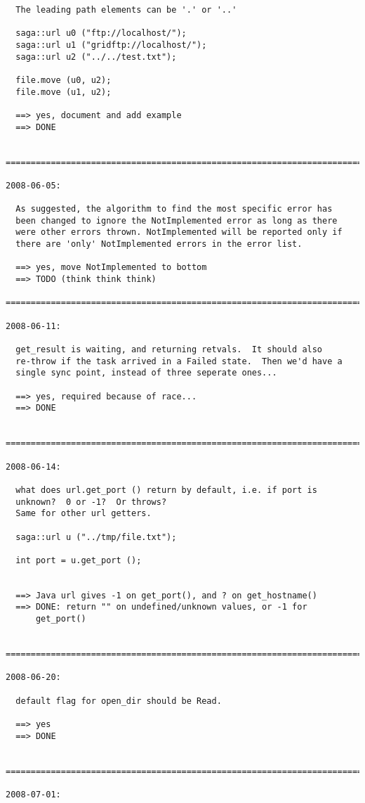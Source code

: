 \documentclass{article}
\begin{document}
\begin{verbatim}
  The leading path elements can be '.' or '..'

  saga::url u0 ("ftp://localhost/");
  saga::url u1 ("gridftp://localhost/");
  saga::url u2 ("../../test.txt");

  file.move (u0, u2);
  file.move (u1, u2);

  ==> yes, document and add example
  ==> DONE


=========================================================================

2008-06-05:

  As suggested, the algorithm to find the most specific error has
  been changed to ignore the NotImplemented error as long as there
  were other errors thrown. NotImplemented will be reported only if
  there are 'only' NotImplemented errors in the error list.

  ==> yes, move NotImplemented to bottom
  ==> TODO (think think think)

=========================================================================

2008-06-11:

  get_result is waiting, and returning retvals.  It should also
  re-throw if the task arrived in a Failed state.  Then we'd have a
  single sync point, instead of three seperate ones...

  ==> yes, required because of race...
  ==> DONE


=========================================================================

2008-06-14:

  what does url.get_port () return by default, i.e. if port is
  unknown?  0 or -1?  Or throws?
  Same for other url getters.

  saga::url u ("../tmp/file.txt");

  int port = u.get_port ();


  ==> Java url gives -1 on get_port(), and ? on get_hostname()
  ==> DONE: return "" on undefined/unknown values, or -1 for
      get_port()


=========================================================================

2008-06-20:

  default flag for open_dir should be Read.

  ==> yes
  ==> DONE


=========================================================================

2008-07-01:


\end{verbatim}
\end{document}
